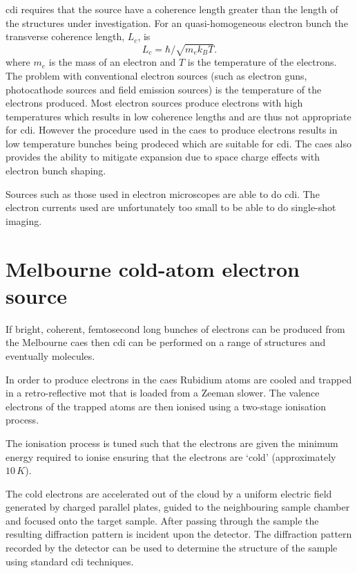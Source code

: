 \Gls{cdi} requires that the source have a coherence length greater than the length of the structures under investigation. For an quasi-homogeneous electron bunch the transverse coherence length, $L_c$, is\cite{van_oudheusden_electron_2007}
\begin{equation}
L_c = \hbar/\sqrt{m_e k_B T}.
\end{equation}
where $m_e$ is the mass of an electron and $T$ is the temperature of the electrons. The problem with conventional electron sources (such as electron guns, photocathode sources and field emission sources) is the temperature of the electrons produced. Most electron sources produce electrons with high temperatures which results in low coherence lengths and are thus not appropriate for \gls{cdi}. However the procedure used in the \gls{caes} to produce electrons results in low temperature bunches being prodeced which are suitable for \gls{cdi}. The \gls{caes} also provides the ability to mitigate expansion due to space charge effects with electron bunch shaping\cite{mcculloch_arbitrarily_2011}.

Sources such as those used in electron microscopes are able to do \gls{cdi}. The electron currents used are unfortunately too small to be able to do single-shot imaging.

\section{Melbourne cold-atom electron source}

If bright, coherent, femtosecond long bunches of electrons can be produced from the Melbourne \gls{caes} then \gls{cdi} can be performed on a range of structures and eventually molecules.

In order to produce electrons in the \gls{caes} Rubidium atoms are cooled and trapped in a retro-reflective \gls{mot} that is loaded from a Zeeman slower\cite{phillips_laser_1982, phillips_cooling_1987, bell_slow_2010}. The valence electrons of the trapped atoms are then ionised using a two-stage ionisation process.

The ionisation process is tuned such that the electrons are given the minimum energy required to ionise ensuring that the electrons are `cold' (approximately $10\,\unit{K}$\cite{mcculloch_arbitrarily_2011}).

The cold electrons are accelerated out of the cloud by a uniform electric field generated by charged parallel plates, guided to the neighbouring sample chamber and focused onto the target sample. After passing through the sample the resulting diffraction pattern is incident upon the detector. The diffraction pattern recorded by the detector can be used to determine the structure of the sample using standard \gls{cdi} techniques.

